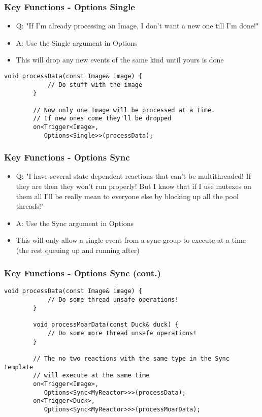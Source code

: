 \documentclass{beamer}
\begin{document}
\begin{frame}[fragile]
	\frametitle {Key Functions - Options Single}
	\begin{itemize}
		\item Q: "If I'm already processing an Image, I don't want a new one till I'm done!"
		\item A: Use the Single argument in Options
		\item This will drop any new events of the same kind until yours is done
	\end{itemize}

	\begin{lstlisting}[language=nuclear]
		void processData(const Image& image) {
		    // Do stuff with the image
		}

		// Now only one Image will be processed at a time.
		// If new ones come they'll be dropped
		on<Trigger<Image>,
		   Options<Single>>(processData);
	\end{lstlisting}
\end{frame}

\begin{frame}[fragile]
	\frametitle {Key Functions - Options Sync}
	\begin{itemize}
		\item Q: "I have several state dependent reactions that can't be multithreaded! If they are then they won't run properly! But I know that if I use mutexes on them all I'll be really mean to everyone else by blocking up all the pool threads!"
		\item A: Use the Sync argument in Options
		\item This will only allow a single event from a sync group to execute at a time (the rest queuing up and running after)
	\end{itemize}
\end{frame}

\begin{frame}[fragile]
	\frametitle {Key Functions - Options Sync (cont.)}
	\begin{lstlisting}[language=nuclear]
		void processData(const Image& image) {
		    // Do some thread unsafe operations!
		}

		void processMoarData(const Duck& duck) {
		    // Do some more thread unsafe operations!
		}

		// The no two reactions with the same type in the Sync template
		// will execute at the same time
		on<Trigger<Image>,
		   Options<Sync<MyReactor>>>(processData);
		on<Trigger<Duck>,
		   Options<Sync<MyReactor>>>(processMoarData);
	\end{lstlisting}
\end{frame}
\end{document}
